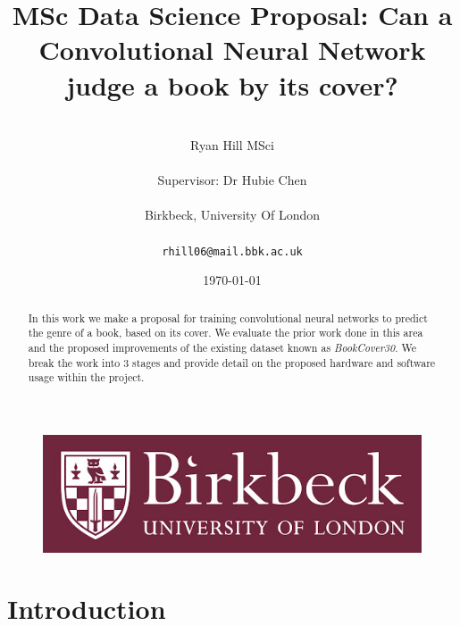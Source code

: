 \documentclass[12pt]{article}
\numberwithin{equation}{section}
\numberwithin{figure}{section}
\begin{document}
\renewcommand\citeform[1]{[#1]}
%
\title{MSc Data Science Proposal: Can a Convolutional Neural Network judge a book by its cover?}
\author{\\Ryan Hill MSci\\\\
Supervisor: Dr Hubie Chen\\\\
Birkbeck, University Of London\\\\
\texttt{rhill06@mail.bbk.ac.uk}}
\date{\today}
\maketitle
\thispagestyle{empty}
\graphicspath{{images/}}
\begin{abstract}
	In this work we make a proposal for training convolutional neural networks to predict the genre of a book, based on its cover. We evaluate the prior work done in this area and the proposed improvements of the existing dataset known as \emph{BookCover30}. We break the work into 3 stages and provide detail on the proposed hardware and software usage within the project.
\end{abstract}
\begin{figure}[!b]
	\centering
	\includegraphics[scale=0.4]{bbk_logo.jpg}
\end{figure}

\clearpage
%
{\hypersetup{linkcolor=black}
\tableofcontents}
\thispagestyle{empty}
\clearpage
%
\setcounter{page}{1}
\section{Introduction} %
\label{sec:intro}
\end{document}
